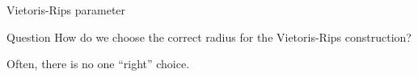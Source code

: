 \documentclass[usenames,dvipsnames,aspectratio=1610]{beamer}
\begin{document}
\begin{frame}{Vietoris-Rips parameter}
  \begin{block}{Question}
  How do we choose the correct radius for the Vietoris-Rips construction?
\end{block}

Often, there is no one ``right'' choice.
\begin{center}

\end{center}
\end{frame}
\end{document}
